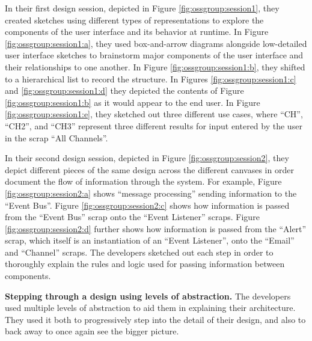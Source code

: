 In their first design session, depicted in Figure \ref{fig:ossgroup:session1}, they created sketches using different types of representations to explore the components of the user interface and its behavior at runtime. In Figure \ref{fig:ossgroup:session1:a}, they used box-and-arrow diagrams alongside low-detailed user interface sketches to brainstorm major components of the user interface and their relationships to one another. In Figure \ref{fig:ossgroup:session1:b}, they shifted to a hierarchical list to record the structure. In Figures \ref{fig:ossgroup:session1:c} and \ref{fig:ossgroup:session1:d} they depicted the contents of Figure \ref{fig:ossgroup:session1:b} as it would appear to the end user. In Figure \ref{fig:ossgroup:session1:e}, they sketched out three different use cases, where ``CH'', ``CH2'', and ``CH3'' represent three different results for input entered by the user in the scrap ``All Channels''.

In their second design session, depicted in Figure \ref{fig:ossgroup:session2}, they depict different pieces of the same design across the different canvases in order document the flow of information through the system. For example, Figure \ref{fig:ossgroup:session2:a} shows ``message processing'' sending information to the ``Event Bus''. Figure \ref{fig:ossgroup:session2:c} shows how information is passed from the ``Event Bus'' scrap onto the ``Event Listener'' scraps. Figure \ref{fig:ossgroup:session2:d} further shows how information is passed from the ``Alert'' scrap, which itself is an instantiation of an ``Event Listener'', onto the ``Email'' and ``Channel'' scraps. The developers sketched out each step in order to thoroughly explain the rules and logic used for passing information between components. 

\textbf{Stepping through a design using levels of abstraction. } The developers used multiple levels of abstraction to aid them in explaining their architecture. They used it both to progressively step into the detail of their design, and also to back away to once again see the bigger picture.

